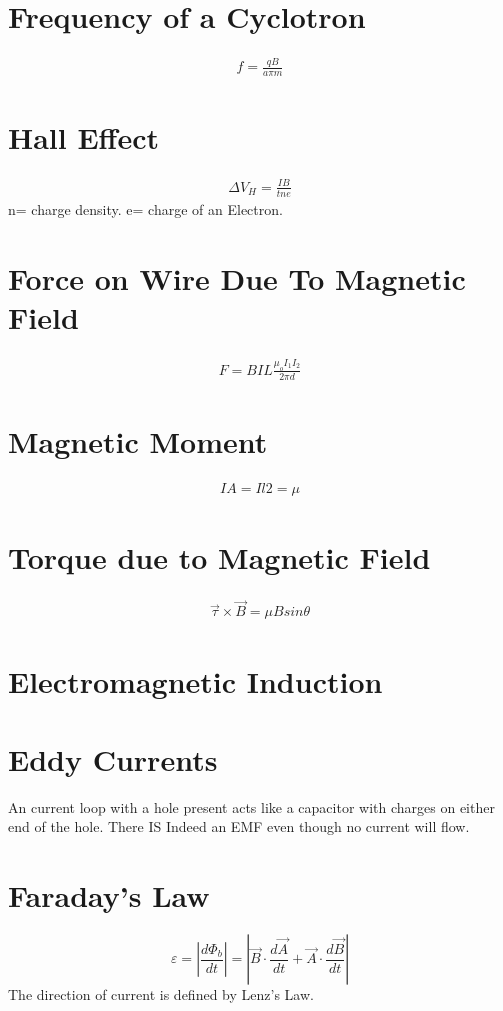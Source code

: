 \documentclass[12pt]{article}
\numberwithin{equation}{section}
\begin{document}
\section{Frequency of a Cyclotron}
\begin{align}
f = \frac{qB}{a\pi m}
\end{align}

\section{Hall Effect}
\begin{align}
\Delta V_H = \frac{IB}{tne}
\end{align}
n= charge density.
e= charge of an Electron.

\section{Force on Wire Due To Magnetic Field}
\begin{align*}
F=BIL
\frac{\mu_o I_1 I_2}{2\pi d} 
\end{align*}

\section{Magnetic Moment}
\begin{align}
IA = Il2 = \mu
\end{align}
\section{Torque due to Magnetic Field}
\begin{align}
\vec{\tau} \times \vec{B} = \mu B sin \theta
\end{align}

\section{Electromagnetic Induction}

\section{Eddy Currents}
An current loop with a hole present acts like a capacitor with charges on either end of the hole. There IS Indeed an EMF even though no current will flow. 
 
\section{Faraday's Law}
\begin{equation}
\varepsilon=\left|\frac{d\Phi_{b}}{dt}\right|=\left|\vec{B} \cdot \frac{d\vec{A}}{dt}+\vec{A} \cdot \frac{d\vec{B}}{dt} \right|
\end{equation}
The direction of current is defined by Lenz's Law.
\end{document}
